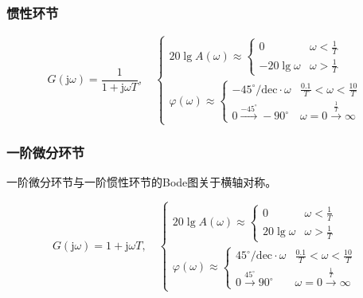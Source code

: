 \documentclass[cn, blue, normal, 12pt]{elegantnote}
\begin{document}
\subsubsection{惯性环节}

\begin{equation}
    G(\mathrm{j}\omega)=\frac{1}{1+\mathrm{j}\omega T}, \quad 
    \left\{
        \begin{array}{l}
            20\lg{A(\omega)}\approx\left\{
                \begin{array}{ll}
                    0 & \omega<\frac{1}{T} \\
                    -20\lg{\omega} & \omega>\frac{1}{T}
                \end{array}
            \right. \\
            \varphi(\omega)\approx\left\{
                \begin{array}{ll}
                    -45^{\circ}/\mathrm{dec}\cdot\omega & \frac{0.1}{T}<\omega<\frac{10}{T} \\
                    0 \stackrel{-45^{\circ}}{\rightarrow} -90^{\circ} & \omega=0 \stackrel{\frac{1}{T}}{\rightarrow} \infty
                \end{array}
            \right.
        \end{array}
    \right.
\end{equation}

\subsubsection{一阶微分环节}

一阶微分环节与一阶惯性环节的Bode图关于横轴对称。

\begin{equation}
    G(\mathrm{j}\omega)=1+\mathrm{j}\omega T, \quad 
    \left\{
        \begin{array}{l}
            20\lg{A(\omega)}\approx\left\{
                \begin{array}{ll}
                    0 & \omega<\frac{1}{T} \\
                    20\lg{\omega} & \omega>\frac{1}{T}
                \end{array}
            \right. \\
            \varphi(\omega)\approx\left\{
                \begin{array}{ll}
                    45^{\circ}/\mathrm{dec}\cdot\omega & \frac{0.1}{T}<\omega<\frac{10}{T} \\
                    0 \stackrel{45^{\circ}}{\rightarrow} 90^{\circ} & \omega=0 \stackrel{\frac{1}{T}}{\rightarrow} \infty
                \end{array}
            \right.
        \end{array}
    \right.
\end{equation}
\end{document}

